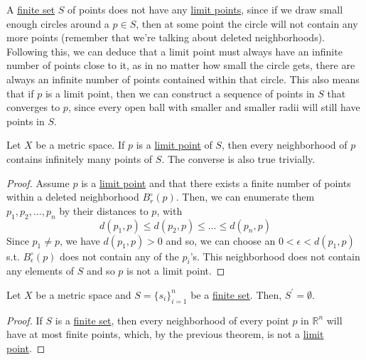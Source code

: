   A \hyperref[st-def:finite-set]{finite set} $S$ of points does not have any \hyperref[def:limit-point]{limit points}, since if we draw small enough circles around a $p \in S$, then at some point the circle will not contain any more points (remember that we're talking about deleted neighborhoods). Following this, we can deduce that a limit point must always have an infinite number of points close to it, as in no matter how small the circle gets, there are always an infinite number of points contained within that circle. This also means that if $p$ is a limit point, then we can construct a sequence of points in $S$ that converges to $p$, since every open ball with smaller and smaller radii will still have points in $S$.

  \begin{theorem}
    \label{thm:neighborhood-of-limit-point-contains-infinite}
    Let $X$ be a metric space. If $p$ is a \hyperref[def:limit-point]{limit point} of $S$, then every neighborhood of $p$ contains infinitely many points of $S$. The converse is also true trivially. 
  \end{theorem}
  \begin{proof}
    Assume $p$ is a \hyperref[def:limit-point]{limit point} and that there exists a finite number of points within a deleted neighborhood $B_r^\circ (p)$. Then, we can enumerate them $p_1, p_2, \ldots, p_n$ by their distances to $p$, with 
    \begin{equation}
      d(p_1, p) \leq d(p_2, p) \leq \ldots \leq d(p_n, p)
    \end{equation}
    Since $p_1 \neq p$, we have $d(p_1, p) > 0$ and so, we can choose an $0 < \epsilon < d(p_1, p)$ s.t. $B_\epsilon^\circ (p)$ does not contain any of the $p_i$'s. This neighborhood does not contain any elements of $S$ and so $p$ is not a limit point. 
  \end{proof}

  \begin{corollary}
    \label{thm:finite-set-in-metric-space-has-no-limit-points}
    Let $X$ be a metric space and $S = \{s_i\}_{i=1}^n$ be a \hyperref[st-def:finite-set]{finite set}. Then, $S^\prime = \emptyset$.  
  \end{corollary}
  \begin{proof}
    If $S$ is a \hyperref[st-def:finite-set]{finite set}, then every neighborhood of every point $p$ in $\mathbb{R}^n$ will have at most finite points, which, by the previous theorem, is not a \hyperref[def:limit-point]{limit point}. 
  \end{proof}

